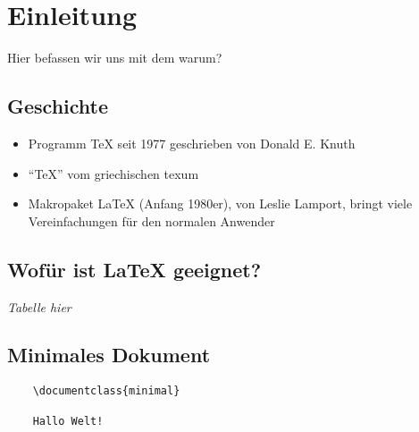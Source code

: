 \section{Einleitung}
Hier befassen wir uns mit dem warum?

\subsection{Geschichte}
\begin{itemize}
    \item Programm TeX seit 1977 geschrieben von Donald E. Knuth
    \item "`TeX"' vom griechischen texum
    \item Makropaket LaTeX (Anfang 1980er), von Leslie Lamport, bringt viele Vereinfachungen für den normalen Anwender
\end{itemize}


\subsection{Wofür ist LaTeX geeignet?}
\textit{Tabelle hier}
\blindtext

\subsection{Minimales Dokument}

\begin{verbatim}
    \documentclass{minimal}
    
    Hallo Welt!
    
\end{verbatim}

\newpage